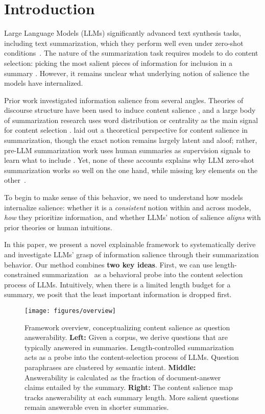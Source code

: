 \section{Introduction}
Large Language Models (LLMs) significantly advanced text synthesis tasks, including text summarization, which they perform well even under zero-shot conditions~\cite{Goyal:2023:arXiv,Zhang:2024:TACL}.
The nature of the summarization task requires models to do content selection: picking the most salient pieces of information for inclusion in a summary \cite{Mani:1999:advances}.
However, it remains unclear what underlying notion of salience the models have internalized.

Prior work investigated information salience from several angles.
Theories of discourse structure have been used to induce content salience \cite{Marcu:1999:advances,Louis:2010:SIGDIAL}, and a large body of summarization research uses word distribution or centrality as the main signal for content selection \cite{Nenkova:2012:survey,Nazari:2019:survey}. \citet{Peyrard:2019:ACL} laid out a theoretical perspective for content salience in summarization, though the exact notion remains largely latent and aloof; rather, pre-LLM summarization work uses human summaries as supervision signals to learn what to include \cite[][\emph{inter alia}]{Gehrmann:2018:EMNLP,Chen:2018:ACL,Liu:2019:EMNLP}.
Yet, none of these accounts explains why LLM zero-shot summarization works so well on the one hand, while missing key elements on the other~\cite{Kim:2024:COLM,Trienes:2024:ACL,Huang:2024:NAACL}.

To begin to make sense of this behavior, we need to understand how models internalize salience: whether it is a \emph{consistent} notion within and across models, \emph{how} they prioritize information, and whether LLMs' notion of salience \emph{aligns} with prior theories or human intuitions.

In this paper, we present a novel explainable framework to systematically derive and investigate LLMs' grasp of information salience through their summarization behavior.
Our method combines \textbf{two key ideas}. First, we can use length-constrained summarization~\cite{Fan:2018:NGT,He:2022:EMNLP} as a behavioral probe into the content selection process of LLMs.
Intuitively, when there is a limited length budget for a summary, we posit that the least important information is dropped first.

\begin{figure*}[t]
\texttt{[image: figures/overview]}
\caption{
    Framework overview, conceptualizing content salience as question answerability.
    \textbf{Left:} Given a corpus, we derive questions that are typically answered in summaries. Length-controlled summarization acts as a probe into the content-selection process of LLMs.
    Question paraphrases are clustered by semantic intent.
    \textbf{Middle:} Answerability is calculated as the fraction of document-answer claims entailed by the summary.
    \textbf{Right:} The content salience map tracks answerability at each summary length. More salient questions remain answerable even in shorter summaries.
}
\label{fig:overview}
\end{figure*}

